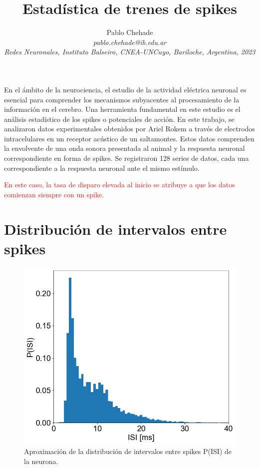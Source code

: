 \documentclass[aps,prb,twocolumn,superscriptaddress,floatfix,longbibliography]{revtex4-2}
\newcounter{para}
\begin{document}
\newcommand{\mytitle}{Estadística de trenes de spikes}

\title{\mytitle}

\author{Pablo Chehade \\
    \small \textit{pablo.chehade@ib.edu.ar} \\
    \small \textit{Redes Neuronales, Instituto Balseiro, CNEA-UNCuyo, Bariloche, Argentina, 2023} \\}
    
    
    
\maketitle

En el ámbito de la neurociencia, el estudio de la actividad eléctrica neuronal es esencial para comprender los mecanismos subyacentes al procesamiento de la información en el cerebro. Una herramienta fundamental en este estudio es el análisis estadístico de los spikes o potenciales de acción. En este trabajo, se analizaron datos experimentales obtenidos por Ariel Rokem a través de electrodos intracelulares en un receptor acústico de un saltamontes. Estos datos comprenden la envolvente de una onda sonora presentada al animal y la respuesta neuronal correspondiente en forma de spikes. Se registraron 128 series de datos, cada una correspondiente a la respuesta neuronal ante el mismo estímulo.

\textcolor{red}{En este caso, la tasa de disparo elevada al inicio se atribuye a que los datos comienzan siempre con un spike.}

\section{Distribución de intervalos entre spikes}

\begin{figure}[h]
  \includegraphics[clip=true,width=0.9\columnwidth]{ISI_histogram.png}
  \caption{Aproximación de la distribución de intervalos entre spikes P(ISI) de la neurona.}
   \label{fig:ISI_histogram}
\end{figure}
\end{document}
